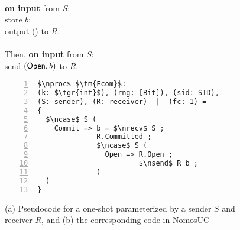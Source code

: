 \begin{figure}
\begin{minipage}{0.38\textwidth}
\begin{bbox}[title={Functionality $\F_{\m{com}}(S, R)$}]\\
\textbf{on input}  from $S$:\\
\hspace*{1em} store $b$;\\
\hspace*{1em} output () to $R$.\\ \\
Then, \textbf{on input}  from $S$:\\
\hspace*{1em} send $(\mathsf{Open}, b)$ to $R$.
\end{bbox}
\end{minipage}
\hspace{3em}
\begin{minipage}{0.5\textwidth}
\begin{lstlisting}[basicstyle=\footnotesize\BeraMonottFamily, frame=single, mathescape, numbers=left]
$\nproc$ $\tm{Fcom}$: 
(k: $\tgr{int}$), (rng: [Bit]), (sid: SID),
(S: sender), (R: receiver)  |- (fc: 1) =
{
  $\ncase$ S (
    Commit => b = $\nrecv$ S ;
              R.Committed ;
              $\ncase$ S (
                Open => R.Open ;
                        $\nsend$ R b ;
              )
  )
}
\end{lstlisting}
\end{minipage}
\caption{(a) Pseudocode for a one-shot \Fcom parameterized by a sender $S$ and receiver $R$,
and (b) the corresponding code in NomosUC}
\label{fig:fcomideal}
\vspace{-4mm}
\end{figure}
